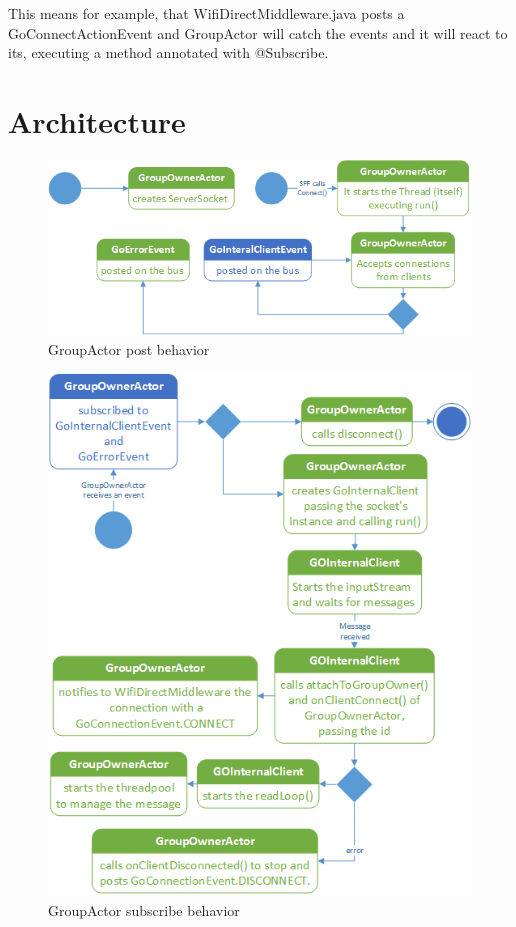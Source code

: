 This means for example, that \textsf{WifiDirectMiddleware.java} posts a \textsf{GoConnectActionEvent} and \textsf{GroupActor} will catch the events and it will react to its, executing a method annotated with \textsf{@Subscribe}.

\section{Architecture}

\begin{figure}[thpb]
	\centering
	\includegraphics[scale=0.5]{./images/chap2/uml-parte0-2.png}
	\caption{GroupActor post behavior}
	\label{uml-part0-2}
\end{figure}	

\begin{figure}[thpb]
	\centering
	\includegraphics[scale=0.6]{./images/chap2/uml-parte0-3.png}
	\caption{GroupActor subscribe behavior}
	\label{uml-part0-3}
\end{figure}	

